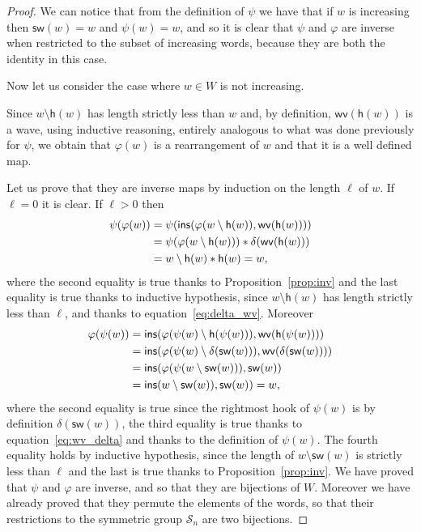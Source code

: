 \documentclass[10pt,a4paper]{amsart}
\newcommand{\sw}{\mathsf{sw}}
\newcommand{\ins}{\mathsf{ins}}
\newcommand{\h}{\mathsf{h}}
\newcommand{\wv}{\mathsf{wv}}
\theoremstyle{definition}
\theoremstyle{remark}
\numberwithin{equation}{section}
\begin{document}
\begin{proof}
We can notice that from the definition of $\psi$ we have that if $w$ is increasing then $\sw(w)=w$ and $\psi(w)=w$, and so it is clear that $\psi$ and $\varphi$ are inverse when restricted to the subset of increasing words, because they are both the identity in this case.

Now let us consider the case where $w\in W$ is not increasing.

Since $w\setminus\h(w)$ has length strictly less than $w$ and, by definition, $\wv(\h(w))$ is a wave, using inductive reasoning, entirely analogous to what was done previously for $\psi$, we obtain that $\varphi(w)$ is a rearrangement of $w$ and that it is a well defined map. 

Let us prove that they are inverse maps by induction on the length $\ell$ of $w$. If $\ell=0$ it is clear. If $\ell>0$ then
\begin{align}
\psi(\varphi(w))&=\psi(\ins(\varphi(w\setminus\h(w)),\wv(\h(w))))\notag\\
&=\psi(\varphi(w\setminus\h(w)))*\delta(\wv(\h(w)))\\
&=w\setminus\h(w)*\h(w)=w,\notag
\end{align}
where the second equality is true thanks to Proposition~\ref{prop:inv} and the last equality is true thanks to inductive hypothesis, since $w\setminus\h(w)$ has length strictly less than $\ell$, and thanks to equation~\eqref{eq:delta_wv}. Moreover
\begin{align}
    \varphi(\psi(w))&=\ins(\varphi(\psi(w)\setminus\h(\psi(w))),\wv(\h(\psi(w))))\notag\\
    &=\ins(\varphi(\psi(w)\setminus\delta(\sw(w))),\wv(\delta(\sw(w))))\\
    &=\ins(\varphi(\psi(w\setminus\sw(w))),\sw(w))\notag\\
    &=\ins(w\setminus\sw(w)),\sw(w))=w\notag,
\end{align}
where the second equality is true since the rightmost hook of $\psi(w)$ is by definition $\delta(\sw(w))$, the third equality is true thanks to equation~\eqref{eq:wv_delta} and thanks to the definition of $\psi(w)$. The fourth equality holds by inductive hypothesis, since the length of $w\setminus\sw(w)$ is strictly less than $\ell$ and the last is true thanks to Proposition~\ref{prop:inv}. We have proved that $\psi$ and $\varphi$ are inverse, and so that they are bijections of $W$. Moreover we have already proved that they permute the elements of the words, so that their restrictions to the symmetric group $\mathcal{S}_n$ are two bijections.


\end{proof}
\end{document}
